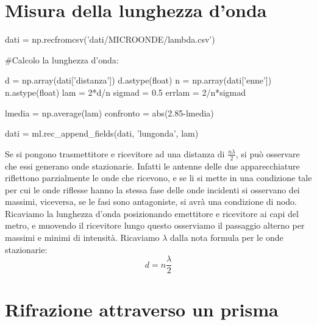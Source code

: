 \begin{center}
\end{center}


\section{Misura della lunghezza d'onda}

\begin{sagesilent}
dati = np.recfromcsv('dati/MICROONDE/lambda.csv')

#Calcolo la lunghezza d'onda:

d = np.array(dati['distanza'])
d.astype(float)
n = np.array(dati['enne'])
n.astype(float)
lam = 2*d/n
sigmad = 0.5
errlam = 2/n*sigmad

lmedia = np.average(lam)
confronto = abs(2.85-lmedia)

dati = ml.rec_append_fields(dati, 'lungonda', lam)

\end{sagesilent}

Se si pongono trasmettitore e ricevitore ad una distanza di $\frac{n \lambda}{2}$, si può osservare che essi generano onde stazionarie. Infatti le antenne delle due apparecchiature riflettono parzialmente le onde che ricevono, e se li si mette in una condizione tale per cui le onde riflesse hanno la stessa fase delle onde incidenti si osservano dei massimi, viceversa, se le fasi sono antagoniste, si avrà una condizione di nodo.
Ricaviamo la lunghezza d'onda posizionando emettitore e ricevitore ai capi del metro, e muovendo il ricevitore lungo questo osserviamo  il passaggio alterno per massimi e minimi di intensità. Ricaviamo $\lambda$ dalla nota formula per le onde stazionarie:
\begin{equation}
d = n\frac{\lambda}{2}
\label{d}
\end{equation}


\begin{center}
\end{center}




\section{Rifrazione attraverso un prisma}

